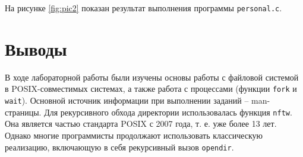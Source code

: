 

На рисунке \ref{fig:pic2} показан результат выполнения программы \lstinline{personal.c}.


\section{Выводы}
\label{sec:conclusion}

В ходе лабораторной работы были изучены основы работы с файловой системой в POSIX-совместимых системах, а также работа с процессами (функции \lstinline{fork} и \lstinline{wait}).
Основной источник информации при выполнении заданий -- man-страницы.
Для рекурсивного обхода директории использовалась функция \lstinline{nftw}. Она является частью стандарта POSIX с 2007 года, т. е. уже более 13 лет.
Однако многие программисты продолжают использовать классическую реализацию, включающую в себя рекурсивный вызов \lstinline{opendir}.
